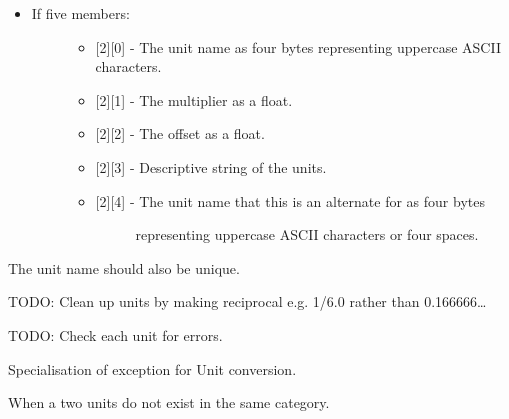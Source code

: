 \documentclass[letterpaper,10pt,english]{sphinxmanual}
\begin{document}
\begin{itemize}
\begin{itemize}
\item {} \begin{description}
\item[{If five members:}] \leavevmode\begin{itemize}
\item {} 
{[}2{]}{[}0{]} - The unit name as four bytes representing uppercase ASCII characters.

\item {} 
{[}2{]}{[}1{]} - The multiplier as a float.

\item {} 
{[}2{]}{[}2{]} - The offset as a float.

\item {} 
{[}2{]}{[}3{]} - Descriptive string of the units.

\item {} \begin{description}
\item[{{[}2{]}{[}4{]} - The unit name that this is an alternate for as four bytes}] \leavevmode
representing uppercase ASCII characters or four spaces.

\end{description}

\end{itemize}

\end{description}

\end{itemize}

\end{itemize}

The unit name should also be unique.

TODO: Clean up units by making reciprocal e.g. 1/6.0 rather than 0.166666…

TODO: Check each unit for errors.

\begin{fulllineitems}
\label{\detokenize{ref/LIS/core/Units:TotalDepth.LIS.core.Units.ExceptionUnits}}
Specialisation of exception for Unit conversion.

\end{fulllineitems}


\begin{fulllineitems}
\label{\detokenize{ref/LIS/core/Units:TotalDepth.LIS.core.Units.ExceptionUnitsMissmatchedCategory}}
When a two units do not exist in the same category.

\end{fulllineitems}
\end{document}
